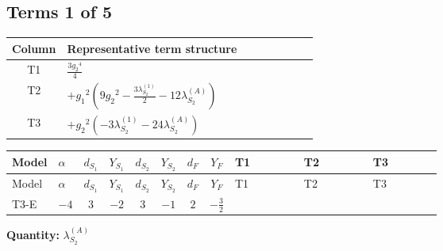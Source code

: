 \documentclass[8pt]{article}
\begin{document}
\begin{landscape}
\subsection*{Terms 1 of 5}
\begin{center}
\begin{tabular}{@{}c >{\raggedright\arraybackslash}p{0.82\linewidth}@{}}
\toprule
Column & Representative term structure \\
\midrule
T1 & \(\displaystyle \frac{3 {g_2}^4}{4}\) \\
\midrule
T2 & \(\displaystyle +{g_1}^2 \left(9 {g_2}^2-\frac{3 {\lambda_{S_2}^{(1)}}}{2}-12 {\lambda_{S_2}^{(A)}}\right)\) \\
\midrule
T3 & \(\displaystyle +{g_2}^2 (-3 {\lambda_{S_2}^{(1)}}-24 {\lambda_{S_2}^{(A)}})\) \\
\midrule
\bottomrule
\end{tabular}
\end{center}
\smallskip
\tiny
\begin{longtable}{@{}llcccccc >{\raggedright\arraybackslash}p{0.21\linewidth} >{\raggedright\arraybackslash}p{0.21\linewidth} >{\raggedright\arraybackslash}p{0.21\linewidth}@{}}
\toprule
Model & $\alpha$ & $d_{S_1}$ & $Y_{S_1}$ & $d_{S_2}$ & $Y_{S_2}$ & $d_F$ & $Y_F$ & T1 & T2 & T3 \\
\midrule
\endfirsthead
\toprule
Model & $\alpha$ & $d_{S_1}$ & $Y_{S_1}$ & $d_{S_2}$ & $Y_{S_2}$ & $d_F$ & $Y_F$ & T1 & T2 & T3 \\
\midrule
\endhead
T3-E & $-4$ & $3$ & $-2$ & $3$ & $-1$ & $2$ & $-\frac{3}{2}$ & \scriptsize\adjustbox{max width=\linewidth}{$\begin{gathered} \frac{3 {g_2}^4}{4}\end{gathered}$} & \scriptsize\adjustbox{max width=\linewidth}{$\begin{gathered} +{g_1}^2 \left(9 {g_2}^2-\frac{3 {\lambda_{S_2}^{(1)}}}{2}-12 {\lambda_{S_2}^{(A)}}\right)\end{gathered}$} & \scriptsize\adjustbox{max width=\linewidth}{$\begin{gathered} +{g_2}^2 (-3 {\lambda_{S_2}^{(1)}}-24 {\lambda_{S_2}^{(A)}})\end{gathered}$} \\
\midrule
\bottomrule
\end{longtable}
\clearpage
\noindent\textbf{Quantity: }$\lambda_{S_2}^{(A)}$\par\smallskip

\end{landscape}
\end{document}
